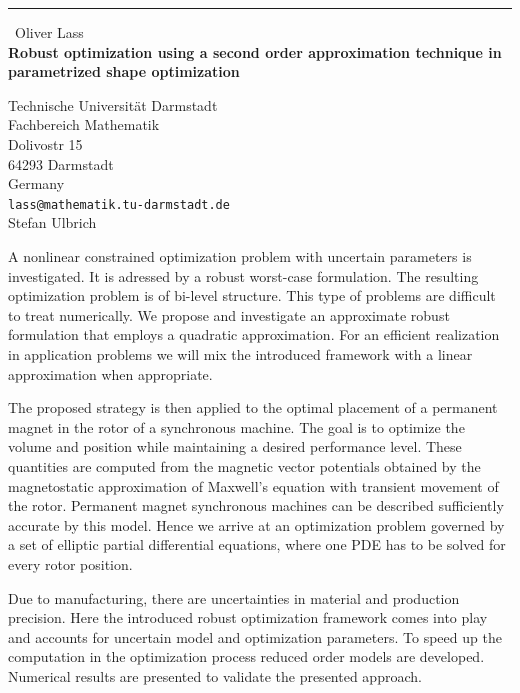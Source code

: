 \documentclass{report}
\begin{document}
\begin{center}
\rule{6in}{1pt} \
{\large Oliver Lass \\
{\bf Robust optimization using a second order approximation technique in parametrized shape optimization }}

Technische Universit\"at Darmstadt \\ Fachbereich Mathematik \\ Dolivostr 15 \\ 64293 Darmstadt \\ Germany
\\
{\tt lass@mathematik.tu-darmstadt.de}\\
Stefan Ulbrich\end{center}

A nonlinear constrained optimization problem with uncertain parameters is
investigated. It is adressed by a robust worst-case formulation. The
resulting optimization problem is of bi-level structure. This type of
problems are difficult to treat numerically. We propose and investigate
an approximate robust formulation that employs a quadratic approximation.
For an efficient realization in application problems we will mix the
introduced framework with a linear approximation when appropriate.

The proposed strategy is then applied to the optimal placement of a
permanent magnet in the rotor of a synchronous machine. The goal is to
optimize the volume and position while maintaining a desired performance
level. These quantities are computed from the magnetic vector potentials
obtained by the magnetostatic approximation of Maxwell's equation with
transient movement of the rotor. Permanent magnet synchronous machines
can be described sufficiently accurate by this model. Hence we arrive at
an optimization problem governed by a set of elliptic partial
differential equations, where one PDE has to be solved for every rotor
position.

Due to manufacturing, there are uncertainties in material and production
precision. Here the introduced robust optimization framework comes into
play and accounts for uncertain model and optimization parameters. To
speed up the computation in the optimization process reduced order models
are developed. Numerical results are presented to validate the presented
approach.
\end{document}

